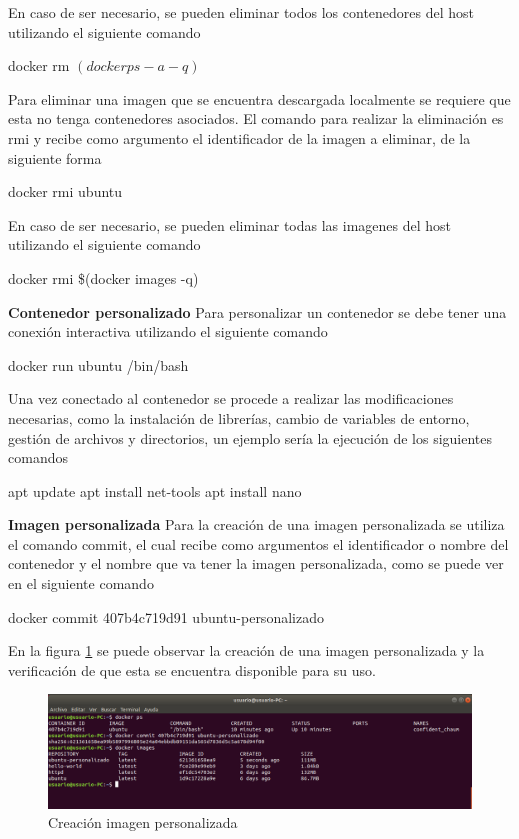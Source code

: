 En caso de ser necesario, se pueden eliminar todos los contenedores del host utilizando el siguiente comando 
\begin{commandshell} docker rm $(docker ps -a -q)$ \end{commandshell}

Para eliminar una imagen que se encuentra descargada localmente se requiere que esta no tenga contenedores asociados. El comando para realizar la eliminación es rmi y recibe como argumento el identificador de la imagen a eliminar, de la siguiente forma

\begin{commandshell} docker rmi ubuntu \end{commandshell}

En caso de ser necesario, se pueden eliminar todas las imagenes del host utilizando el siguiente comando 
\begin{commandshell}docker rmi \$(docker images -q)\end{commandshell}

\textbf{Contenedor personalizado}
Para personalizar un contenedor se debe tener una conexión interactiva utilizando el siguiente comando
\begin{commandshell}docker run ubuntu /bin/bash \end{commandshell}

Una vez conectado al contenedor se procede a realizar las modificaciones necesarias, como la instalación de librerías, cambio de variables de entorno, gestión de archivos y directorios, un ejemplo sería la ejecución de los siguientes comandos
\begin{commandshellroot}
apt update
apt install net-tools
apt install nano
\end{commandshellroot}

\textbf{Imagen personalizada}
Para la creación de una imagen personalizada se utiliza el comando commit, el cual recibe como argumentos el identificador o nombre del contenedor y el nombre que va tener la imagen personalizada, como se puede ver en el siguiente comando

\begin{commandshell}docker commit 407b4c719d91 ubuntu-personalizado \end{commandshell}

En la figura \ref{fig:DockerGestion11} se puede observar la creación de una imagen personalizada y la verificación de que esta se encuentra disponible para su uso.

\begin{figure}[!hbtp]
	\centering
	\includegraphics[width=\linewidth]{RE05_Docker/Gestion_basica/REDocker_Gestion11.png}
	\vspace{-0.2cm}
	\caption{Creación imagen personalizada}
	\label{fig:DockerGestion11}
\end{figure}

